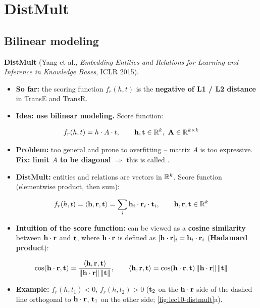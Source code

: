 \section{DistMult}\label{sec:lec10-distmult}

\subsection{Bilinear modeling}\label{sec:lec10-bilinear}

\textbf{DistMult} (Yang et al., \emph{Embedding Entities and Relations for
Learning and Inference in Knowledge Bases}, ICLR 2015).
\begin{itemize}
  \item \textbf{So far:} the scoring function $f_r(h,t)$ is the \textbf{negative
    of L1 / L2 distance} in TransE and TransR.
  \item \textbf{Idea: use bilinear modeling.} Score function:
\end{itemize}
\begin{equation}\label{eq:lec10-bilinear}
  f_r(h,t)=h\cdot A\cdot t,\qquad \mathbf{h},\mathbf{t}\in\mathbb{R}^k,\ \mathbf{A}\in\mathbb{R}^{k\times k}
\end{equation}
\begin{itemize}
  \item \textbf{Problem:} too general and prone to overfitting -- matrix $A$ is
    too expressive. \textbf{Fix: limit $A$ to be diagonal} $\Rightarrow$ this is
    called .
  \item \textbf{DistMult:} entities and relations are vectors in $\mathbb{R}^k$. Score
    function (elementwise product, then sum):
\end{itemize}
\begin{equation}\label{eq:lec10-distmult}
  f_r(h,t)=\langle\mathbf{h},\mathbf{r},\mathbf{t}\rangle=\sum_i\mathbf{h}_i\cdot\mathbf{r}_i\cdot\mathbf{t}_i,
  \qquad \mathbf{h},\mathbf{r},\mathbf{t}\in\mathbb{R}^k
\end{equation}
\begin{itemize}
  \item \textbf{Intuition of the score function:} can be viewed as a
    \textbf{cosine similarity} between $\mathbf{h}\cdot\mathbf{r}$ and $\mathbf{t}$, where
    $\mathbf{h}\cdot\mathbf{r}$ is defined as $[\mathbf{h}\cdot\mathbf{r}]_i=\mathbf{h}_i\cdot\mathbf{r}_i$
    (\textbf{Hadamard product}):
\end{itemize}
\begin{equation}\label{eq:lec10-cos}
  \cos(\mathbf{h}\cdot\mathbf{r},\mathbf{t})=\frac{\langle\mathbf{h},\mathbf{r},\mathbf{t}\rangle}{\left\lVert \mathbf{h}\cdot\mathbf{r} \right\rVert\left\lVert \mathbf{t} \right\rVert},
  \qquad
  \langle\mathbf{h},\mathbf{r},\mathbf{t}\rangle=\cos(\mathbf{h}\cdot\mathbf{r},\mathbf{t})\left\lVert \mathbf{h}\cdot\mathbf{r} \right\rVert\left\lVert \mathbf{t} \right\rVert
\end{equation}
\begin{itemize}
  \item \textbf{Example:} $f_r(h,t_1)<0$, $f_r(h,t_2)>0$ ($\mathbf{t}_2$ on the
    $\mathbf{h}\cdot\mathbf{r}$ side of the dashed line orthogonal to $\mathbf{h}\cdot\mathbf{r}$, $\mathbf{t}_1$ on
    the other side; \cref{fig:lec10-distmult}a).
\end{itemize}

